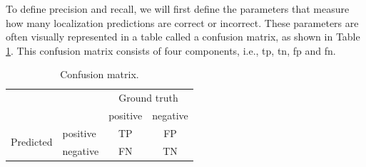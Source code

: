 To define precision and recall, we will first define the parameters that measure how many localization predictions are correct or incorrect. These parameters are often visually represented in a table called a confusion matrix, as shown in Table \ref{tab:confusion_matrix}. This confusion matrix  consists of four components, i.e., \acrfull{tp}, \acrfull{tn}, \acrfull{fp} and \acrfull{fn}.

\begin{table}[ht]
\centering
\begin{tabular}{l|l|c|c|}
\multicolumn{2}{c}{} & \multicolumn{2}{c}{Ground truth} \\
\cline{3-4}
\multicolumn{2}{c|}{} & positive & negative \\
\cline{2-4}
\multirow{2}{*}{Predicted} & positive & TP & FP \\
\cline{2-4}
                           & negative & FN & TN \\
\cline{2-4}
\end{tabular}
\caption[Confusion matrix]{Confusion matrix.}
\label{tab:confusion_matrix}
\end{table}

